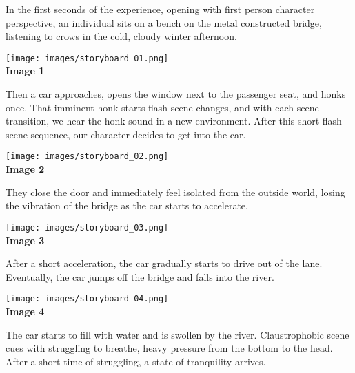         In the first seconds of the experience, opening with first person character perspective, an individual sits on a bench on the metal constructed bridge, listening to crows in the cold, cloudy winter afternoon.\par
        
        \begin{center}
            \texttt{[image: images/storyboard\_01.png]}\\
            \textbf{Image 1}
        \end{center}

        Then a car approaches, opens the window next to the passenger seat, and honks once. That imminent honk starts flash scene changes, and with each scene transition, we hear the honk sound in a new environment. After this short flash scene sequence, our character decides to get into the car.\par

        \begin{center}
            \texttt{[image: images/storyboard\_02.png]}\\
            \textbf{Image 2}
        \end{center}

        They close the door and immediately feel isolated from the outside world, losing the vibration of the bridge as the car starts to accelerate.\par

        \begin{center}
            \texttt{[image: images/storyboard\_03.png]}\\
            \textbf{Image 3}
        \end{center}

        After a short acceleration, the car gradually starts to drive out of the lane. Eventually, the car jumps off the bridge and falls into the river.\par

        \begin{center}
            \texttt{[image: images/storyboard\_04.png]}\\
            \textbf{Image 4}
        \end{center}

        The car starts to fill with water and is swollen by the river. Claustrophobic scene cues with struggling to breathe, heavy pressure from the bottom to the head. After a short time of struggling, a state of tranquility arrives.\par

